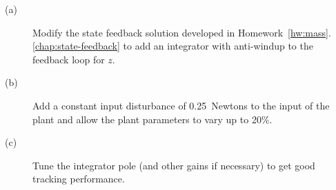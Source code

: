 \begin{description}
\item[(a)] Modify the state feedback solution developed in Homework~\ref{hw:mass}.\ref{chap:state-feedback} to add an integrator with anti-windup to the feedback loop for $z$.
\item[(b)] Add a constant input disturbance of 0.25~Newtons to the input of the plant and allow the plant parameters to vary up to 20\%.
\item[(c)] Tune the integrator pole (and other gains if necessary) to get good tracking performance.
\end{description}

